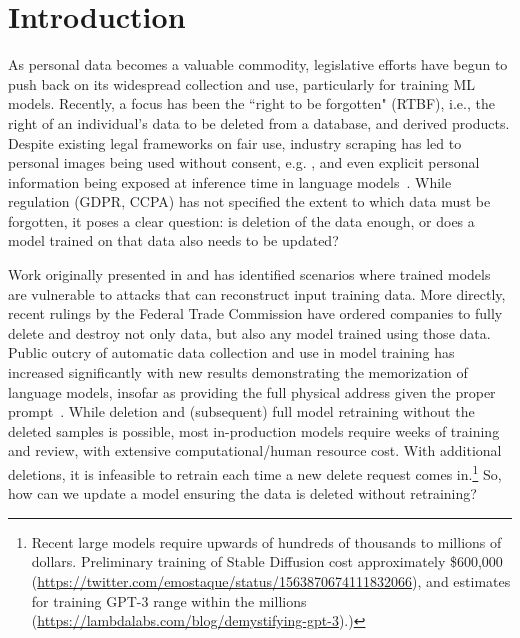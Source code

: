 \section{Introduction}
As personal data becomes a valuable commodity, legislative efforts have begun to push back on its widespread collection and use, particularly for training ML models. Recently, a focus has been the ``right to be forgotten" (RTBF), i.e., the right of an individual's data to be deleted from a database, and derived products.
Despite existing legal frameworks on fair use, industry scraping has led to personal images being used without consent, e.g. \cite{Exposing}, and even explicit personal information being exposed at inference time in language models~\citep{carlini2021extracting}.
While regulation (GDPR, CCPA) has not specified the extent to which data must be forgotten, it poses a clear question: is  deletion of the data enough, or does a model trained on that data also needs to be updated?

Work originally presented in \cite{carlini2019secret} and \cite{carlini2020attack} has identified scenarios where trained models are vulnerable to attacks that can reconstruct input training data. More directly, recent rulings by the Federal Trade Commission \cite{ftc,ftc2} have ordered companies to fully delete and destroy not only data, but also any model trained using those data.
Public outcry of automatic data collection and use in model training has increased significantly with 
new results demonstrating the memorization of language models, insofar as providing the full physical address given the proper prompt~\cite{carlini2021extracting}.
While deletion and (subsequent) full model retraining without the deleted samples is possible, most in-production models require weeks of 
training and review, with extensive computational/human resource cost. With additional deletions, it is infeasible to retrain each time a new delete request comes in.\footnote{Recent large models require upwards of hundreds of thousands to millions of dollars. Preliminary training of Stable Diffusion cost approximately \$600,000 (\url{https://twitter.com/emostaque/status/1563870674111832066}), and estimates for training GPT-3 range within the millions (\url{https://lambdalabs.com/blog/demystifying-gpt-3}).)} 
So, how can we update a model ensuring the data is deleted without retraining?


